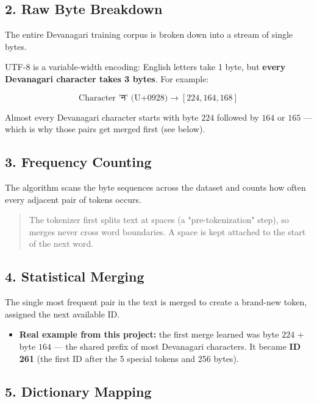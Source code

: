 \documentclass[11pt,a4paper,oneside]{report}
\providecommand{\tightlist}{\setlength{\itemsep}{0pt}\setlength{\parskip}{0pt}}
\begin{document}
\subsection{2. Raw Byte Breakdown}\label{2-raw-byte-breakdown}

The entire Devanagari training corpus is broken down into a stream of single bytes.

UTF-8 is a variable-width encoding: English letters take 1 byte, but \textbf{every Devanagari character takes 3 bytes}. For example:

\[\text{Character 'न' (U+0928)} \longrightarrow [224, 164, 168]\]

Almost every Devanagari character starts with byte \(224\) followed by \(164\) or \(165\) --- which is why those pairs get merged first (see below).

\subsection{3. Frequency Counting}\label{3-frequency-counting}

The algorithm scans the byte sequences across the dataset and counts how often every adjacent pair of tokens occurs.

\begin{quote}
The tokenizer first splits text at spaces (a "pre-tokenization" step), so merges never cross word boundaries. A space is kept attached to the start of the next word.
\end{quote}

\subsection{4. Statistical Merging}\label{4-statistical-merging}

The single most frequent pair in the text is merged to create a brand-new token, assigned the next available ID.

\begin{itemize}
\tightlist
\item
  \textbf{Real example from this project:} the first merge learned was byte \(224\) + byte \(164\) --- the shared prefix of most Devanagari characters. It became \textbf{ID 261} (the first ID after the 5 special tokens and 256 bytes).
\end{itemize}

\subsection{5. Dictionary Mapping}\label{5-dictionary-mapping}
\end{document}
